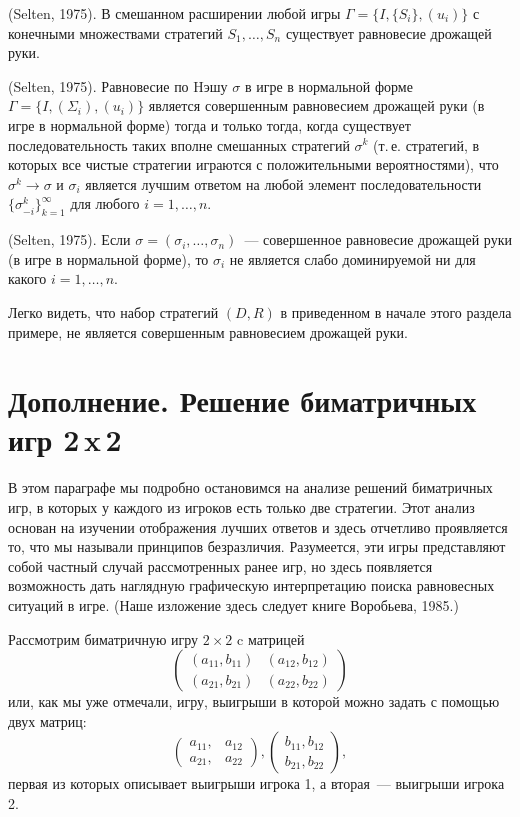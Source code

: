 \documentclass[12pt]{article}
\begin{document}
{\begin{proposition} {\rm (Selten, 1975)}. В
смешанном расширении любой игры $\Gamma=\{I,\{S_i\},(u_i)\}$ с
конечными множествами стратегий $S_1,\ldots,S_n$ существует
равновесие дрожащей руки.
\end{proposition}

\begin{proposition} {\rm
(Selten, 1975)}. Равновесие по Hэшу $\sigma$ в игре в нормальной
форме $\Gamma=\{I,(\Sigma_i),(u_i)\}$ является совершенным
равновесием дрожащей руки (в игре в нормальной форме) тогда и только
тогда, когда существует последовательность таких вполне смешанных
стратегий $\sigma^k$ (т.\,е. стратегий, в которых все чистые
стратегии играются с положительными вероятностями), что
$\sigma^k\rightarrow\sigma$ и $\sigma_i$ является лучшим ответом на
любой элемент последовательности $\{\sigma^k_{-i}\}^\infty_{k=1}$
для любого $i=1,\ldots,n$.
\end{proposition}

\begin{proposition}
{\rm (Selten, 1975)}. Если $\sigma=(\sigma_i,\ldots,\sigma_n)$~---
совершенное равновесие дрожащей руки (в игре в нормальной форме), то
$\sigma_i$ не является слабо доминируемой ни для какого
$i=1,\ldots,n$.
\end{proposition}

Легко видеть, что набор стратегий $(D,R)$ в приведенном в начале
этого раздела примере, не является совершенным равновесием дрожащей
руки.

\section{Дополнение.  Решение биматричных игр 2\,x\,2}

В этом параграфе мы подробно остановимся на анализе решений
биматричных игр, в которых у каждого из игроков есть только две
стратегии. Этот анализ основан на изучении отображения лучших
ответов и здесь отчетливо проявляется то, что мы называли принципов
безразличия. Разумеется, эти игры представляют собой частный случай
рассмотренных ранее игр, но здесь появляется возможность дать
наглядную графическую интерпретацию поиска равновесных ситуаций в
игре.  (Наше изложение здесь следует книге Воробьева, 1985.)

Рассмотрим биматричную игру $2\times 2$ c матрицей
$$
\left(\begin{array}{cc}
(a_{11},b_{11})&(a_{12},b_{12})\\
(a_{21},b_{21})&(a_{22},b_{22})
\end{array} \right)
$$
или, как мы уже отмечали, игру, выигрыши в которой можно задать с
помощью двух матриц:
$$
\left(\begin{array}{cc}
a_{11},&a_{12}\\
a_{21},&a_{22}
\end{array} \right),
\left(\begin{array}{cc}
b_{11},b_{12}\\
b_{21},b_{22}
\end{array} \right),
$$
первая из которых описывает выигрыши игрока 1, а вторая~--- выигрыши
игрока 2.

}
\end{document}
